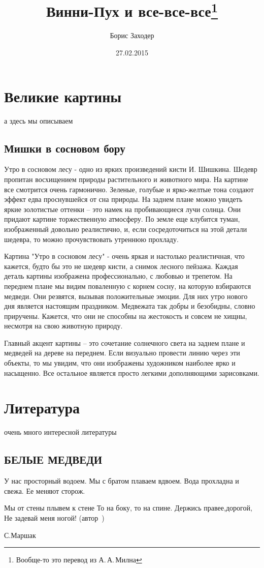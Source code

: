 \documentclass[11pt]{book}
\author{Борис Заходер}
\title{Винни-Пух и все-все-все\thanks{Вообще-то это перевод из А.\,А.\,Милна}}
\date{27.02.2015}
\begin{document}
	\maketitle
	\tableofcontents
	\def\@oddhead{subsection\hfil\thepage}
	\newpage
	\section{Великие картины}
		а здесь мы описываем
	\newpage
	\subsection{Мишки в сосновом бору}
		Утро в сосновом лесу - одно из ярких произведений кисти
И. Шишкина. Шедевр пропитан восхищением природы растительного и
животного мира. На картине все смотрится очень гармонично. Зеленые,
голубые и ярко-желтые тона создают эффект едва проснувшейся от сна
природы. На заднем плане можно увидеть яркие золотистые оттенки –
это намек на пробивающиеся лучи солнца. Они придают картине
торжественную атмосферу. По земле еще клубится туман, изображенный
довольно реалистично, и, если сосредоточиться на этой детали
шедевра, то можно прочувствовать утреннюю прохладу.

		Картина "Утро в сосновом лесу" - очень яркая и настолько
реалистичная, что кажется, будто бы это не шедевр кисти, а снимок
лесного пейзажа. Каждая деталь картины изображена профессионально, с
любовью и трепетом. На переднем плане мы видим поваленную с корнем
сосну, на которую взбираются медведи. Они резвятся, вызывая
положительные эмоции. Для них утро нового дня является настоящим
праздником. Медвежата так добры и безобидны, словно приручены.
Кажется, что они не способны на жестокость и совсем не хищны,
несмотря на свою животную природу.

		Главный акцент картины – это сочетание солнечного света на заднем
плане и медведей на дереве на переднем. Если визуально провести
линию через эти объекты, то мы увидим, что они изображены художником
наиболее ярко и насыщенно. Все остальное является просто легкими
дополняющими зарисовками.
	\newpage
	\section{Литература}
		очень много интересной литературы
	\newpage
	\subsection{БЕЛЫЕ МЕДВЕДИ}
		У нас просторный водоем. Мы с братом плаваем вдвоем. Вода прохладна
и свежа. Ее меняют сторож.

		Мы от стены плывем к стене То на боку, то на спине. Держись
правее,дорогой, Не задевай меня ногой! (автор~\cite{Marshak})
	\newpage
	\begin{thebibliography}{0}
		С.Маршак

	\end{thebibliography}
\end{document}
